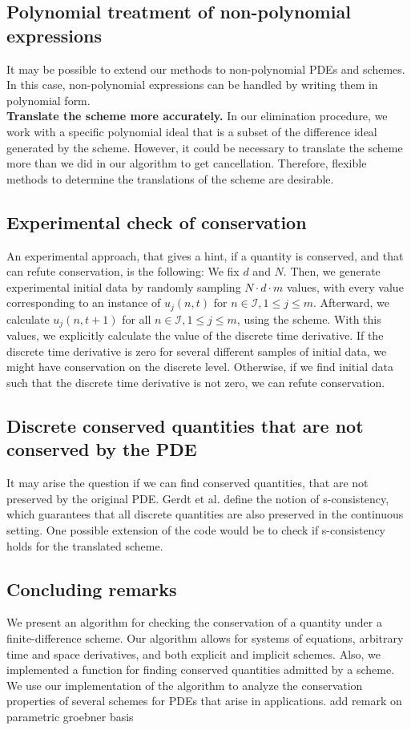 \documentclass[runningheads]{llncs}
\newcommand{\1}{\chi}
\begin{document}
\subsection{ Polynomial treatment of non-polynomial expressions}
It may be possible to extend our methods to non-polynomial PDEs and schemes. In this case, non-polynomial expressions can be handled by writing them in polynomial form.\\
{\bf Translate the scheme more accurately.}
In our elimination procedure, we work with a specific polynomial ideal that is a subset of the difference ideal generated by the scheme. However, it could be necessary to translate the scheme more than we did in our algorithm to get cancellation. Therefore, flexible methods to determine the translations of the scheme are desirable.\\
\subsection{Experimental check of conservation}
An experimental approach, that gives a hint, if a quantity is conserved, and that can refute conservation, is the following:
We fix \(d\) and \(N\). Then, we generate experimental initial data by randomly sampling \(N\cdot d\cdot m\) values, with every value corresponding to an instance of \(u_j(n,t)\) for \(n\in\mathcal{I},1\leq j\leq m\). Afterward, we calculate \(u_j(n,t+1)\) for all \(n\in\mathcal{I},1\leq j\leq m\), using the scheme. With this values, we explicitly calculate the value of the discrete time derivative.
If the discrete time derivative is zero for several different samples of initial data, we might have conservation on the discrete level. Otherwise, if we find initial data such that the discrete time derivative is not zero, we can refute conservation.\\
\subsection{Discrete conserved quantities that are not conserved by the PDE}
It may arise the question if we can find conserved quantities, that are not preserved by the original PDE. Gerdt et al. \cite{gerdt10,gerdt12} define the notion of s-consistency, which guarantees that all discrete quantities are also preserved in the continuous setting. One possible extension of the code would be to check if s-consistency holds for the translated scheme.\\
\subsection{Concluding remarks}
We present an algorithm for checking the conservation of a quantity under a finite-difference scheme. Our algorithm allows for systems of equations, arbitrary time and space derivatives, and both explicit and implicit schemes. Also, we implemented a function for finding conserved quantities admitted by a scheme. We use our implementation of the algorithm to analyze the conservation properties of several schemes for PDEs that arise in applications. {\color{red} add remark on parametric groebner basis}




\end{document}
